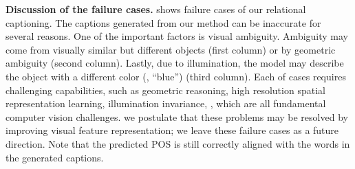 \noindent\textbf{Discussion of the failure cases.}
 shows failure cases of {our} relational captioning.
The captions generated from our method can be inaccurate for several reasons.
One of the important factors is visual ambiguity. 
Ambiguity may come from visually similar but different objects (first column) or by geometric ambiguity (second column). 
{Lastly}, due to illumination, the model may describe the object {with} 
a different color (\eg, ``blue'') (third column).
{Each of cases requires challenging capabilities, such as geometric reasoning, high resolution spatial representation learning, illumination invariance, \etc, which are all fundamental computer vision challenges.}
we postulate that these problems may be resolved by improving visual feature representation; we leave these failure cases as a future direction.
Note that 
the predicted POS is still correctly aligned with the words in the generated captions.










